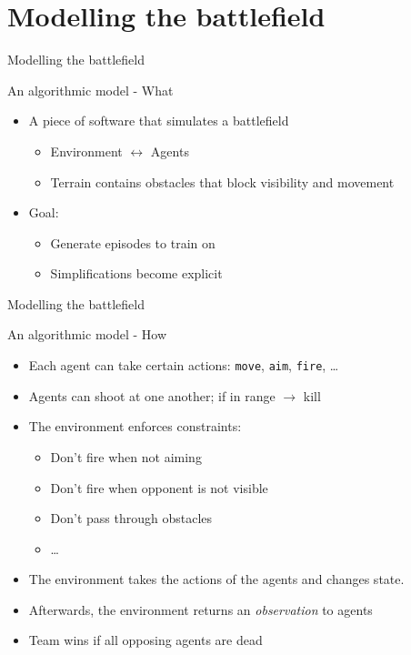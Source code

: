 \documentclass{beamer}
\begin{document}
\section{Modelling the battlefield}
\begin{frame}{Modelling the battlefield}
\begin{block}{An algorithmic model - What}
\begin{itemize}
    \item A piece of software that simulates a battlefield
    \begin{itemize}
        \item Environment $\leftrightarrow$ Agents
        \item Terrain contains obstacles that block visibility and movement
    \end{itemize}
    \item Goal:
    \begin{itemize}
        \item Generate episodes to train on
        \item Simplifications become explicit
    \end{itemize}
\end{itemize}
\end{block}
\end{frame}


\begin{frame}{Modelling the battlefield}
\begin{block}{An algorithmic model - How}
\begin{itemize}
    \item Each agent can take certain actions: {\tt move}, {\tt aim}, {\tt fire}, \ldots
    \item Agents can shoot at one another; if in range $\rightarrow$ kill
    \item The environment enforces constraints:
        \begin{itemize}
            \item Don't fire when not aiming
            \item Don't fire when opponent is not visible
            \item Don't pass through obstacles
            \item \ldots
        \end{itemize}
    \item The environment takes the actions of the agents and changes state.
    \item Afterwards, the environment returns an \emph{observation} to agents
    \item Team wins if all opposing agents are dead
\end{itemize}
\end{block}
\end{frame}
\end{document}

